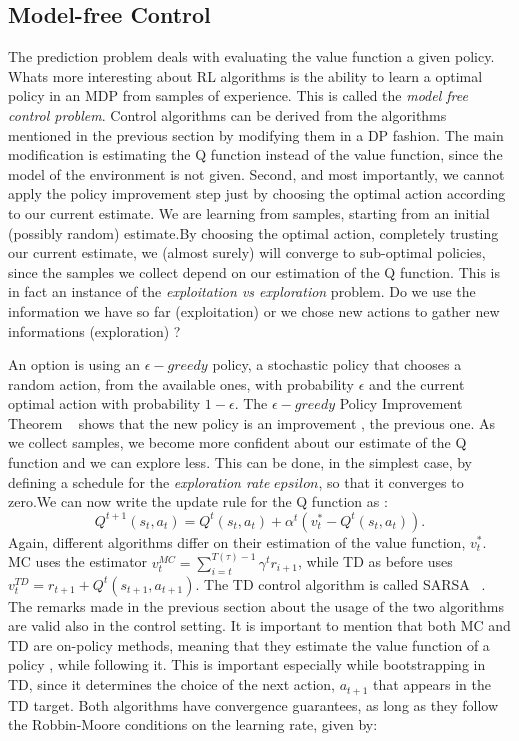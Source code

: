 \subsection{Model-free Control}
The prediction problem deals with evaluating the value function a given policy. Whats more interesting about RL algorithms is the ability to learn a optimal policy in an MDP from samples of experience. This is called the \emph{model free control problem}. Control algorithms can be derived from the algorithms mentioned in the previous section by modifying them in a DP fashion. The main modification is estimating the Q function instead of the value function, since the model of the environment is not given. Second, and most importantly, we cannot apply the policy improvement step just by choosing the optimal action according to our current estimate. We are learning from samples, starting from an initial (possibly random) estimate.By choosing the optimal action, completely trusting our current estimate, we (almost surely) will converge to sub-optimal policies, since the samples we collect depend on our estimation of the Q function. This is in fact an instance of the \emph{exploitation vs exploration} problem. Do we use the information we have so far (exploitation) or we chose new actions to gather new informations (exploration) ? \par
An option is using an $\epsilon-greedy$ policy, a stochastic policy that chooses a random action, from the available ones, with probability $\epsilon$ and the current optimal action with probability  $1-\epsilon$. The $\epsilon-greedy$ Policy Improvement Theorem ~\cite{Sutton:1998:IRL:551283} shows that the new policy is an improvement \wrt, the previous one. As we collect samples, we become more confident about our estimate of the Q function and we can explore less. This can be done, in the simplest case, by defining a schedule for the \emph{exploration rate} $epsilon$, so that it converges to zero.We can now write the update rule for the Q function as :
\begin{equation}
	Q^{t+1}(s_t,a_t)=Q^{t}(s_t,a_t)+ \alpha^t\left(v^{*}_t-Q^{t}(s_t,a_t) \right).
\end{equation}
Again, different algorithms differ on their estimation of the value function, $v^{*}_t$.
MC uses the estimator $v^{MC}_{t}=\sum_{i=t}^{T(\tau)-1} \gamma^{t} r_{i+1}$, while TD as before uses $v^{TD}_t=r_{t+1}+ Q^{t}(s_{t+1},a_{t+1})$. The TD control algorithm is called SARSA ~\cite{rummery:cuedtr94}. The remarks made in the previous section about the usage of the two algorithms are valid also in the control setting. It is important to mention that both MC and TD are on-policy methods, meaning that they estimate the value function of a policy , while following it. This is important especially while bootstrapping in TD, since it determines the choice of the next action, $a_{t+1}$ that appears in the TD target. Both algorithms have convergence guarantees, as long as they follow the Robbin-Moore conditions on the learning rate, given by:
